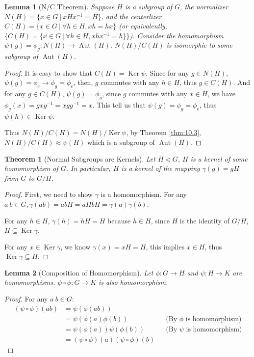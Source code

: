 \documentclass[14pt]{extarticle}
\newtheorem{theorem}{Theorem}[section]
\newtheorem{lemma}{Lemma}[section]
\DeclareMathOperator{\Ker}{Ker}
\DeclareMathOperator{\Aut}{Aut}
\newcommand{\inv}[1]{#1^{-1}}
\newcommand{\normalin}{\triangleleft}
\newcommand{\1}{\{e\}}
\begin{document}
\begin{lemma}[N/C Theorem]
  Suppose $H$ is a subgroup of $G$,
  the normalizer $N(H) = \{ x \in G \ | \ xH\inv{x} = H \}$,
  and the centerlizer $C(H) = \{ x \in G \ | \ \forall h \in H, xh = hx \}$
  (or equivalently, $\{ C(H) = \{ x \in G \ | \ \forall h \in H, xh\inv{x} = h\} \}$).
  Consider the homomorphism $\psi(g) = \phi_g : N(H) \rightarrow \Aut(H)$.
  $N(H)/C(H)$ is isomorphic to some subgroup of $\Aut(H)$.
\end{lemma}
\begin{proof}
  It is easy to show that $C(H) = \Ker \psi$.
  Since for any $g \in N(H)$, $\psi(g) = \phi_e \rightarrow \phi_g = \phi_e$,
  then, $g$ commutes with any $h \in H$, thus $g \in C(H)$. 
  And for any $g \in C(H)$, $\psi(g) = \phi_g$, 
  since $g$ commutes with any $x \in H$, we have $\phi_g(x) = gx\inv{g} = xg\inv{g} = x$.
  This tell us that $\psi(g) = \phi_g = \phi_e$, thus $\psi(h) \in \Ker \psi$.

  Thus $N(H)/C(H) = N(H)/\Ker \psi$, by Theorem \ref{thm:10.3}, 
  $N(H)/C(H) \approx \psi(H)$ which is a subgroup of $\Aut(H)$.
\end{proof}

\begin{theorem}[Normal Subgroups are Kernels]
  Let $H \normalin G$, 
  $H$ is a kernel of some homomorphism of $G$.
  In particular, $H$ is a kernel of the mapping $\gamma(g) = gH$ from $G$ to $G/H$.
\end{theorem}
\begin{proof}
  First, we need to show $\gamma$ is a homomorphism.
  For any $a \ b \in G, \gamma(ab) = abH = aHbH = \gamma(a)\gamma(b)$.

  For any $h \in H$, $\gamma(h) = hH = H$ because $h \in H$,
  since $H$ is the identity of $G/H$, $H \subseteq \Ker \gamma$.

  For any $x \in \Ker \gamma$, we know $\gamma(x) = xH = H$,
  this implies $x \in H$, thus $\Ker \gamma \subseteq H$.
\end{proof}
  
\begin{lemma}[Composition of Homomorphism]
  Let $\phi : G \rightarrow H$ and $\psi : H \rightarrow K$ are homomorphisms.
  $\psi \circ \phi : G \rightarrow K$  is also homomorphism.
\end{lemma}
\begin{proof}
  For any $a \ b \in G$:
  \begin{align*}
    (\psi \circ \phi)(ab) &= \psi(\phi(ab)) \\
    &= \psi(\phi(a) \phi(b)) && \text{(By $\phi$ is homomorphism)} \\
    &= \psi(\phi(a)) \psi(\phi(b)) && \text{(By $\psi$ is homomorphism)} \\
    &= (\psi \circ \phi)(a) (\psi \circ \phi)(b)
  \end{align*}
\end{proof}
\end{document}
